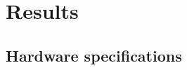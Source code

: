 




\chapter{Results}
\label{ch:results-appendix}

\section{Hardware specifications}
\label{sec:hardware-specifications}

